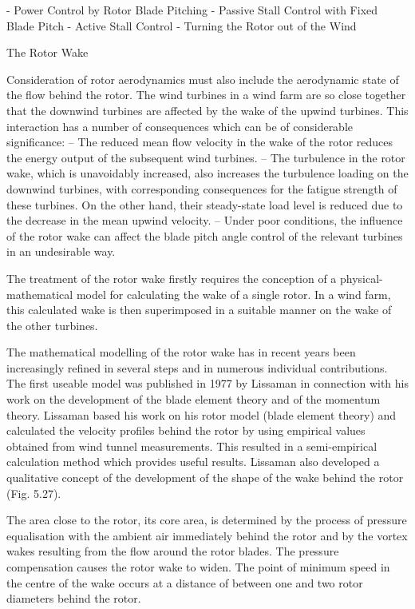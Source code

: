 - Power Control by Rotor Blade Pitching
- Passive Stall Control with Fixed Blade Pitch
- Active Stall Control
- Turning the Rotor out of the Wind

The Rotor Wake

Consideration of rotor aerodynamics must also include the aerodynamic state of the flow behind the rotor. The wind turbines in a wind farm are so close together that the downwind turbines are affected by the wake of the upwind turbines. This interaction has a number of consequences which can be of considerable significance:
– The reduced mean flow velocity in the wake of the rotor reduces the energy output of the subsequent wind turbines.
– The turbulence in the rotor wake, which is unavoidably increased, also increases the turbulence loading on the downwind turbines, with corresponding consequences for the fatigue strength of these turbines. On the other hand, their steady-state load level is reduced due to the decrease in the mean upwind velocity.
– Under poor conditions, the influence of the rotor wake can affect the blade pitch angle control of the relevant turbines in an undesirable way. 

The treatment of the rotor wake firstly requires the conception of a physical-mathematical model for calculating the wake of a single rotor. In a wind farm, this calculated wake is then superimposed in a suitable manner on the wake of the other turbines. 

The mathematical modelling of the rotor wake has in recent years been increasingly refined in several steps and in numerous individual contributions. The first useable model was published in 1977 by Lissaman in connection with his work on the development of the blade element theory and of the momentum theory. Lissaman based his work on his rotor model (blade element theory) and calculated the velocity profiles behind the rotor by using empirical values obtained from wind tunnel measurements. This resulted
in a semi-empirical calculation method which provides useful results. Lissaman also developed a qualitative concept of the development of the shape of the wake behind the rotor (Fig. 5.27).

The area close to the rotor, its core area, is determined by the process of pressure equalisation with the ambient air immediately behind the rotor and by the vortex wakes resulting from the flow around the rotor blades. The pressure compensation causes the rotor wake to widen. The point of minimum speed in the centre of the wake occurs at a distance of between one and two rotor diameters behind the rotor.


